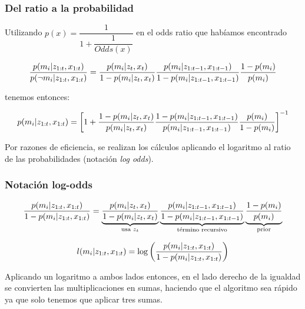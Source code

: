 \begin{frame}
    \frametitle{Del ratio a la probabilidad}
    
    Utilizando $p(x) = \dfrac{1}{1 + \dfrac{1}{Odds(x)}}$ en el odds ratio que habíamos encontrado
    
    \begin{equation*}
         \dfrac{p(m_{i}| z_{1:t}, x_{1:t})}{p(\neg m_{i}| z_{1:t}, x_{1:t})} = \dfrac{p(m_{i} | z_{t}, x_{t})}{1 - p(m_{i} | z_{t}, x_{t})}
        \dfrac{p(m_{i} | z_{1:t-1}, x_{1:t-1})}{1- p(m_{i} | z_{1:t-1}, x_{1:t-1})}
        \dfrac{1 - p(m_{i})} {p(m_{i})}
    \end{equation*}

tenemos entonces:

    \begin{equation*}
    p(m_{i}| z_{1:t}, x_{1:t}) =
    \left[
        1 + 
         \dfrac{1 - p(m_{i} | z_{t}, x_{t})}{p(m_{i} | z_{t}, x_{t})}
        \dfrac{1- p(m_{i} | z_{1:t-1}, x_{1:t-1})}{p(m_{i} | z_{1:t-1}, x_{1:t-1})}
        \dfrac{p(m_{i})}{1 - p(m_{i})}
    \right]^{-1}
    \end{equation*}

    Por razones de eficiencia, se realizan los cálculos aplicando el logaritmo al ratio de las probabilidades (notación \emph{log odds}).
\end{frame}

\begin{frame}
    \frametitle{Notación log-odds}
    \begin{equation*}
        \dfrac{p(m_{i}| z_{1:t}, x_{1:t})}{1 - p(m_{i}| z_{1:t}, x_{1:t})} =  \underbrace{\dfrac{p(m_{i} | z_{t}, x_{t})}{1 - p(m_{i} | z_{t}, x_{t})}}_{\text{usa } z_{t}}
        \underbrace{\dfrac{p(m_{i} | z_{1:t-1}, x_{1:t-1})}{1- p(m_{i} | z_{1:t-1}, x_{1:t-1})}}_{\text{término recursivo}}
        \underbrace{\dfrac{1 - p(m_{i})} {p(m_{i})}}_{\text{prior}}
    \end{equation*}

    \begin{equation*}
   l(m_{i}| z_{1:t}, x_{1:t}) =  \log \left( \dfrac{p(m_{i} | z_{1:t}, x_{1:t})}{1 - p(m_{i} | z_{1:t}, x_{1:t})} \right)
    \end{equation*}

    Aplicando un logaritmo a ambos lados entonces, en el lado derecho de la igualdad se convierten las multiplicaciones en sumas, haciendo que el algoritmo sea rápido ya que solo tenemos que aplicar tres sumas.

\end{frame}

